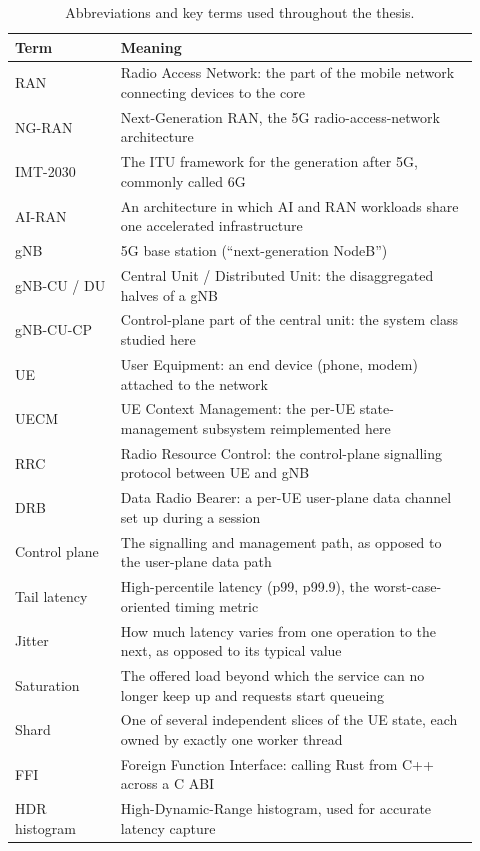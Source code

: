\documentclass[english,oneside,a4paper,censored,csm,software-track-2020]{HYthesisML}
\renewcommand{\arraystretch}{0.95}
\begin{document}
\begin{appendices}
\begin{table}[H]
\centering
\caption[Abbreviations and key terms]{Abbreviations and key terms used throughout the thesis.\label{tab:abbrev}}
\singlespacing
\footnotesize
\renewcommand{\arraystretch}{1.2}
\begin{tabular}{@{}p{0.21\linewidth} p{0.71\linewidth}@{}}
\hline\hline
Term & Meaning \\
\hline
RAN & Radio Access Network: the part of the mobile network connecting devices to the core \\
NG-RAN & Next-Generation RAN, the 5G radio-access-network architecture \\
IMT-2030 & The ITU framework for the generation after 5G, commonly called 6G \\
AI-RAN & An architecture in which AI and RAN workloads share one accelerated infrastructure \\
gNB & 5G base station (``next-generation NodeB'') \\
gNB-CU / DU & Central Unit / Distributed Unit: the disaggregated halves of a gNB \\
gNB-CU-CP & Control-plane part of the central unit: the system class studied here \\
UE & User Equipment: an end device (phone, modem) attached to the network \\
UECM & UE Context Management: the per-UE state-management subsystem reimplemented here \\
RRC & Radio Resource Control: the control-plane signalling protocol between UE and gNB \\
DRB & Data Radio Bearer: a per-UE user-plane data channel set up during a session \\
Control plane & The signalling and management path, as opposed to the user-plane data path \\
Tail latency & High-percentile latency (p99, p99.9), the worst-case-oriented timing metric \\
Jitter & How much latency varies from one operation to the next, as opposed to its typical value \\
Saturation & The offered load beyond which the service can no longer keep up and requests start queueing \\
Shard & One of several independent slices of the UE state, each owned by exactly one worker thread \\
FFI & Foreign Function Interface: calling Rust from C++ across a C ABI \\
HDR histogram & High-Dynamic-Range histogram, used for accurate latency capture \\
\hline
\end{tabular}
\end{table}


\end{appendices}
\end{document}
